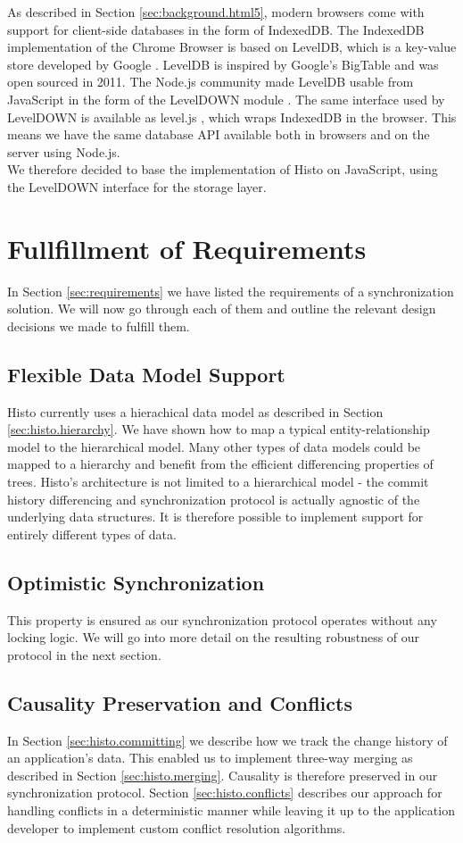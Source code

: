 As described in Section \ref{sec:background.html5}, modern browsers come with support for client-side databases in the form of IndexedDB.
The IndexedDB implementation of the Chrome Browser is based on LevelDB, which is a key-value store developed by Google \cite{leveldb}.
LevelDB is inspired by Google's BigTable \cite{chang2008bigtable} and was open sourced in 2011.
The Node.js community made LevelDB usable from JavaScript in the form of the LevelDOWN module \cite{leveldown}.
The same interface used by LevelDOWN is available as level.js \cite{leveljs}, which wraps IndexedDB in the browser.
This means we have the same database API available both in browsers and on the server using Node.js.\\
We therefore decided to base the implementation of Histo on JavaScript, using the LevelDOWN interface for the storage layer.

\section{Fullfillment of Requirements}
In Section \ref{sec:requirements} we have listed the requirements of a synchronization solution.
We will now go through each of them and outline the relevant design decisions we made to fulfill them.

\subsection*{Flexible Data Model Support}
Histo currently uses a hierachical data model as described in Section \ref{sec:histo.hierarchy}.
We have shown how to map a typical entity-relationship model to the hierarchical model.
Many other types of data models could be mapped to a hierarchy and benefit from the efficient differencing properties of trees.
Histo's architecture is not limited to a hierarchical model - the commit history differencing and synchronization protocol is actually agnostic of the underlying data structures.
It is therefore possible to implement support for entirely different types of data.

\subsection*{Optimistic Synchronization}
This property is ensured as our synchronization protocol operates without any locking logic.
We will go into more detail on the resulting robustness of our protocol in the next section.

\subsection*{Causality Preservation and Conflicts}
In Section \ref{sec:histo.committing} we describe how we track the change history of an application's data.
This enabled us to implement three-way merging as described in Section \ref{sec:histo.merging}.
Causality is therefore preserved in our synchronization protocol.
Section \ref{sec:histo.conflicts} describes our approach for handling conflicts in a deterministic manner while leaving it up to the application developer to implement custom conflict resolution algorithms.

